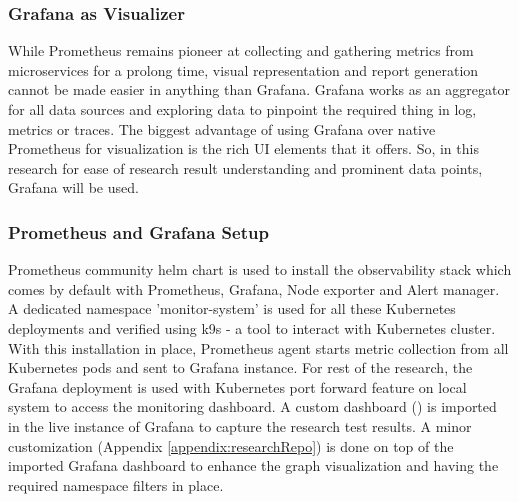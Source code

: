 \subsubsection{Grafana as Visualizer}
While Prometheus remains pioneer at collecting and gathering metrics from microservices for a prolong time, visual representation and report generation cannot be made easier in anything than Grafana. Grafana works as an aggregator for all data sources and exploring data to pinpoint the required thing in log, metrics or traces. The biggest advantage of using Grafana over native Prometheus for visualization is the rich UI elements that it offers. So, in this research for ease of research result understanding and prominent data points, Grafana will be used.

\subsubsection{Prometheus and Grafana Setup}
Prometheus community helm chart is used to install the observability stack which comes by default with Prometheus, Grafana, Node exporter and Alert manager. A dedicated namespace 'monitor-system' is used for all these Kubernetes deployments and verified using k9s - a tool to interact with Kubernetes cluster. With this installation in place, Prometheus agent starts metric collection from all Kubernetes pods and sent to Grafana instance. For rest of the research, the Grafana deployment is used with Kubernetes port forward feature on local system to access the monitoring dashboard. A custom dashboard (\cite{soloGithubPerf}) is imported in the live instance of Grafana to capture the research test results. A minor customization (Appendix \ref{appendix:researchRepo}) is done on top of the imported Grafana dashboard to enhance the graph visualization and having the required namespace filters in place.


